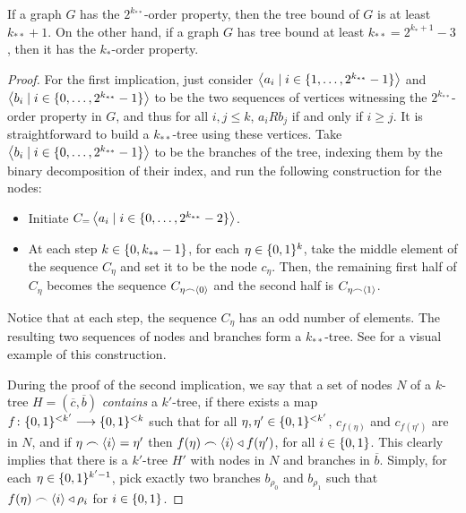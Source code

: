     \begin{theorem} \label{thm:tree_implies_order}
        If a graph $G$ has the $2^{k_{**}}$-order property, then the tree bound of $G$ is at least $k_{**} + 1$.
        On the other hand, if a graph $G$ has tree bound at least $k_{**} = 2^{k_*+1}-3$, then it has the $k_*$-order
        property.
        \begin{proof}
            For the first implication, just consider $\left< a_i \mid i \in \{ 1, \dots, 2^{k_{**}}-1 \} \right>$ and
            $\left< b_i \mid i \in \{ 0, \dots, 2^{k_{**}}-1 \} \right>$ to be the two sequences of vertices witnessing the
            $2^{k_{**}}$-order property in $G$, and thus for all $i,j \leq k$, $a_i R b_j$ if and only if $i \geq j$.
            It is straightforward to build a $k_{**}$-tree using these vertices.
            Take $\left< b_i \mid i \in \{ 0, \dots, 2^{k_{**}}-1 \} \right>$ to be the branches of the tree, indexing them by
            the binary decomposition of their index, and run the following construction for the nodes:
            \begin{itemize}
                \item Initiate $C_\empty = \Partriangle{a_i \mid i \in \parcurly{0, \dots, 2^{k_{**}}-2}}$.
                \item At each step $k \in \{ 0, k_{**}-1 \}$, for each $\eta \in \{ 0,1 \}^k$, take the middle
                    element of the sequence $C_\eta$ and set it to be the node $c_\eta$.
                    Then, the remaining first half of $C_\eta$ becomes the sequence $C_{\eta \frown \left< 0 \right>}$
                    and the second half is $C_{\eta \frown \left< 1 \right>}$.
            \end{itemize}
            Notice that at each step, the sequence $C_\eta$ has an odd number of elements.
            The resulting two sequences of nodes and branches form a $k_{**}$-tree.
            See  for a visual example of this construction.

            During the proof of the second implication, we say that a set of nodes $N$ of a $k$-tree
            $H = (\overline{c},\overline{b})$ \emph{contains} a $k'$-tree, if there exists a map
            $f \colon \{ 0,1 \}^{<k'} \longrightarrow \{ 0,1 \}^{<k}$ such that for all $\eta, \eta' \in \{ 0,1 \}^{<k'}$,
            $c_{f(\eta)}$ and $c_{f(\eta')}$ are in $N$, and if $\eta \frown \left< i \right> = \eta'$ then
            $f(\eta) \frown \left< i \right> \triangleleft f(\eta')$, for all $i \in \{ 0, 1 \}$.
            This clearly implies that there is a $k'$-tree $H'$ with nodes in $N$ and branches in $\overline{b}$.
            Simply, for each $\eta \in \{ 0,1 \}^{k'-1}$, pick exactly two branches $b_{\rho_0}$ and $b_{\rho_1}$ such that
            $f(\eta)\frown\left< i \right> \triangleleft \rho_i$ for $i \in \{ 0,1 \}$.


\end{proof}
\end{theorem}
